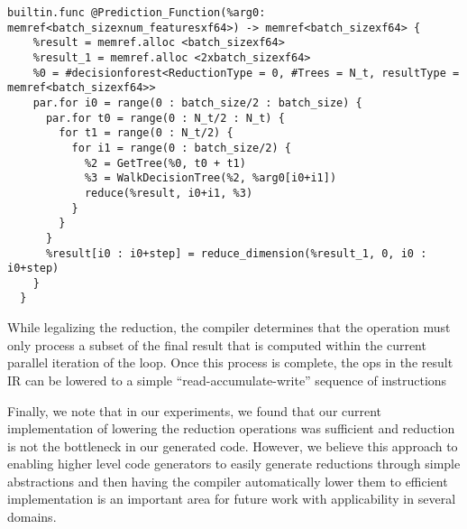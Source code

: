 \begin{lstlisting}[style=c++]
  builtin.func @Prediction_Function(%arg0: memref<batch_sizexnum_featuresxf64>) -> memref<batch_sizexf64> {
    %result = memref.alloc <batch_sizexf64>
    %result_1 = memref.alloc <2xbatch_sizexf64>
    %0 = #decisionforest<ReductionType = 0, #Trees = N_t, resultType = memref<batch_sizexf64>> 
    par.for i0 = range(0 : batch_size/2 : batch_size) {
      par.for t0 = range(0 : N_t/2 : N_t) {
        for t1 = range(0 : N_t/2) {
          for i1 = range(0 : batch_size/2) {
            %2 = GetTree(%0, t0 + t1) 
            %3 = WalkDecisionTree(%2, %arg0[i0+i1])
            reduce(%result, i0+i1, %3)
          }
        }
      }
      %result[i0 : i0+step] = reduce_dimension(%result_1, 0, i0 : i0+step)
    }
  }
\end{lstlisting}

While legalizing the reduction, the compiler determines that the 
 operation must only process a subset of the final 
result that is computed within the current parallel iteration of the 
 loop. Once this process is complete, the  ops in 
the result IR can be lowered to a simple ``read-accumulate-write''
sequence of instructions

Finally, we note that in our experiments, we found that our 
current implementation of lowering the reduction operations 
was sufficient and reduction is not the bottleneck in our 
generated code. However, we believe this approach to enabling 
higher level code generators to easily generate reductions 
through simple abstractions and then having the compiler 
automatically lower them to efficient implementation is an
important area for future work with applicability in several 
domains. 


